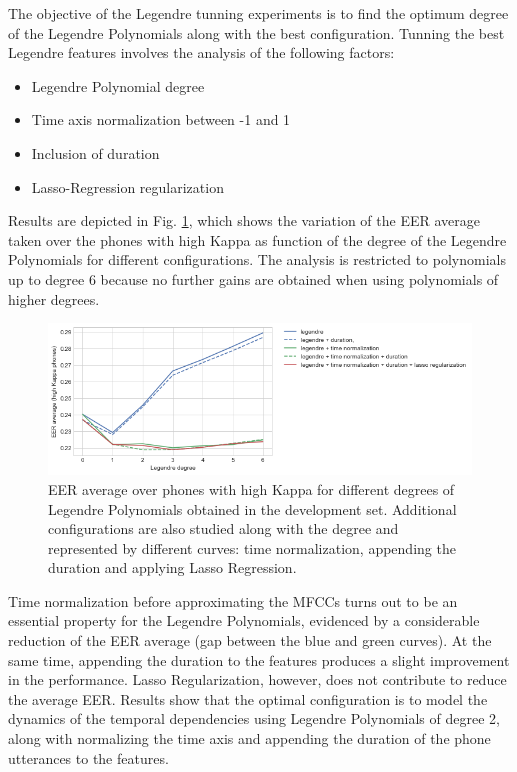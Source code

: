 The objective of the Legendre tunning experiments is to find the optimum degree of the Legendre
Polynomials along with the best configuration.
Tunning the best Legendre features involves the analysis of
the following factors:

\begin{itemize}
	\item Legendre Polynomial degree
	\item Time axis normalization between -1 and 1
	\item Inclusion of duration
	\item Lasso-Regression regularization
\end{itemize}

Results are depicted in Fig. \ref{fig:legendreTunning}, which shows the variation of the
EER average taken over the phones with high Kappa
as function of the degree of the Legendre Polynomials for different configurations.
The analysis is restricted to polynomials up to degree 6 because
no further gains are obtained when using polynomials of higher degrees.


\begin{figure}[H]
	\centering
	\includegraphics[width=1.0\textwidth]{files/figures/results/legendre-dct/legendre-tunning.png}
	\caption{EER average over phones with high Kappa for different
	degrees of Legendre Polynomials obtained in
	the development set. Additional configurations are also studied along with the degree and
	represented by different curves: time normalization, appending the duration and applying
	Lasso Regression.}
	\label{fig:legendreTunning}
\end{figure}

Time normalization before approximating the
MFCCs turns out to be an essential property for the Legendre Polynomials, evidenced by a
considerable reduction of the EER average (gap between the blue and green curves). At the same
time, appending the duration to the features produces a slight improvement in the performance.
Lasso Regularization, however, does not contribute to reduce the average EER.
Results show that the optimal configuration is to model the dynamics of the temporal dependencies
using Legendre Polynomials of degree 2,
along with normalizing the time axis and appending the duration of the
phone utterances to the features.

